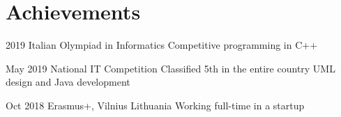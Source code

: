\documentclass{tccv}
\begin{document}

\section{Achievements}

\begin{yearlist}

\item[]{2019}
     {Italian Olympiad in Informatics}
     {Competitive programming in C++}

\item[]{May 2019}
     {National IT Competition}
     {Classified 5th in the entire country \newline
     UML design and Java development}

\item[]{Oct 2018}
     {Erasmus+, Vilnius Lithuania}
     {Working full-time in a startup}

\end{yearlist}
\end{document}
